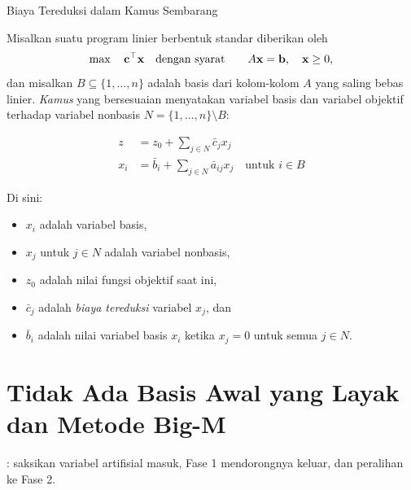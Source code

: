 \begin{definition}{Biaya Tereduksi dalam Kamus Sembarang}\label{def:reduced-cost-general}

Misalkan suatu program linier berbentuk standar diberikan oleh
\[
\max \quad \mathbf{c}^\top \mathbf{x} \quad \mbox{dengan syarat}\quad \quad A\mathbf{x} = \mathbf{b}, \quad \mathbf{x} \geq 0,
\]
dan misalkan \( B \subseteq \{1, \dots, n\} \) adalah basis dari kolom-kolom \( A \) yang saling bebas linier. \emph{Kamus} yang bersesuaian menyatakan variabel basis dan variabel objektif terhadap variabel nonbasis \( N = \{1, \dots, n\} \setminus B \):

\[
\begin{aligned}
z &= z_0 + \sum_{j \in N} \bar{c}_j x_j \\
x_i &= \bar{b}_i + \sum_{j \in N} \bar{a}_{ij} x_j \quad \text{untuk } i \in B
\end{aligned}
\]

Di sini:
\begin{itemize}
    \item \( x_i \) adalah variabel basis,
    \item \( x_j \) untuk \( j \in N \) adalah variabel nonbasis,
    \item \( z_0 \) adalah nilai fungsi objektif saat ini,
    \item \( \bar{c}_j \) adalah \emph{biaya tereduksi} variabel \( x_j \), dan
    \item \( \bar{b}_i \) adalah nilai variabel basis \( x_i \) ketika \( x_j = 0 \) untuk semua \( j \in N \).
\end{itemize}
\end{definition}

\section{Tidak Ada Basis Awal yang Layak dan Metode Big-M}
\label{sec:big-m-dictionary}

\begin{tryit}
: saksikan variabel artifisial masuk, Fase 1 mendorongnya keluar, dan peralihan ke Fase 2.
\end{tryit}



